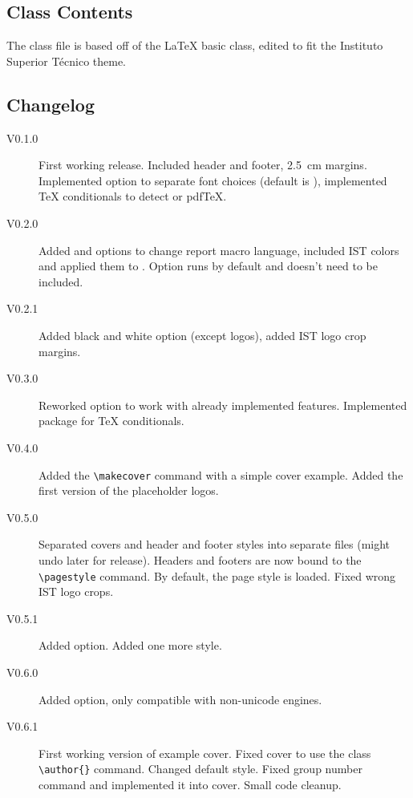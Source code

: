 \subsection{Class Contents}

The class file is based off of the \LaTeX{} basic  class, edited to fit the Instituto Superior Técnico theme.

\subsection{Changelog}

\begin{description}
	\item[V0.1.0] First working release. Included header and footer, \SI{2.5}{\centi\meter} margins. Implemented  option to separate font choices (default is ), implemented \TeX{} conditionals to detect \XeTeX{} or pdf\TeX{}.
	\item[V0.2.0] Added  and  options to change report macro language, included IST colors and applied them to . Option  runs by default and doesn't need to be included.
	\item[V0.2.1] Added black and white option (except logos), added IST logo crop margins.
	\item[V0.3.0] Reworked  option to work with already implemented features. Implemented  package for \TeX{} conditionals.
	\item[V0.4.0] Added the \verb|\makecover| command with a simple cover example. Added the first version of the placeholder logos.
	\item[V0.5.0] Separated covers and header and footer styles into separate files (might undo later for release). Headers and footers are now bound to the \verb|\pagestyle| command. By default, the  page style is loaded. Fixed wrong IST logo crops.
	\item[V0.5.1] Added  option. Added one more style.
	\item[V0.6.0] Added  option, only compatible with non-unicode engines.
	\item[V0.6.1] First working version of example cover. Fixed cover to use the  class \verb|\author{}| command. Changed default style. Fixed group number command and implemented it into cover. Small code cleanup.
\end{description}
